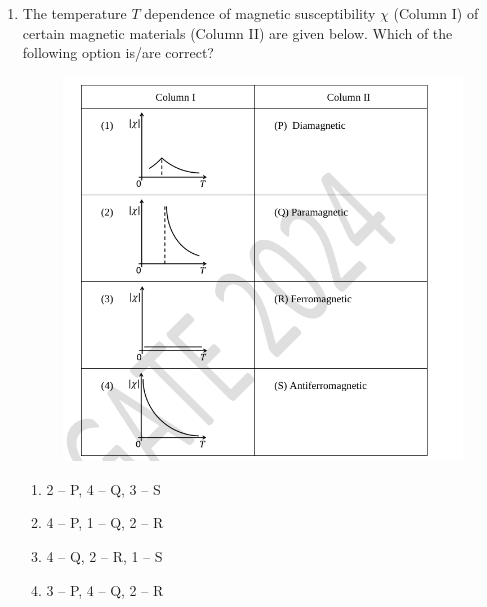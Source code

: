 \documentclass[journal,12pt,onecolumn]{IEEEtran}
\theoremstyle{remark}
\begin{document}
\begin{enumerate}
\item The temperature $T$ dependence of magnetic susceptibility $\chi$ (Column I) of certain magnetic materials (Column II) are given below. Which of the following option is/are correct?
\begin{figure}[H]  
\centering 
\includegraphics[width = 0.7\columnwidth]{fig/Q52.png}     \caption*{}  
\label{fig: Q52} 
\end{figure} 
\begin{enumerate}
    \item 2 -- P, 4 -- Q, 3 -- S
    \item 4 -- P, 1 -- Q, 2 -- R
    \item 4 -- Q, 2 -- R, 1 -- S
    \item 3 -- P, 4 -- Q, 2 -- R
\end{enumerate}


\end{enumerate}
\end{document}
